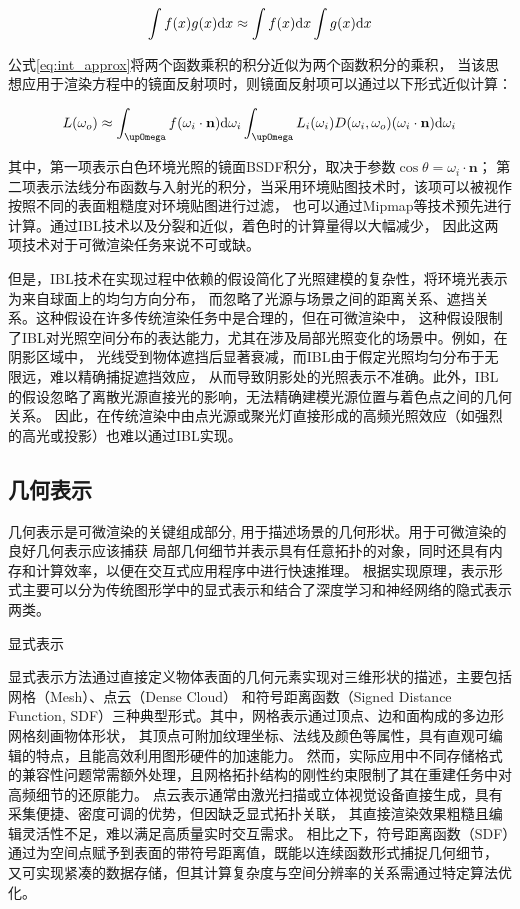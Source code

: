 \begin{equation}
  \int f(x)g(x){\rm{d}}x\approx \int{f(x){\rm{d}}x} \int{g(x){\rm{d}}x}
  \label{eq:int_approx}
\end{equation}

公式\eqref{eq:int_approx}将两个函数乘积的积分近似为两个函数积分的乘积，
当该思想应用于渲染方程中的镜面反射项时，则镜面反射项可以通过以下形式近似计算：

\begin{equation}
  L(\omega_o)\approx 
  \int_{\upOmega}{f(\omega_i\cdot{\bf{n}}){\rm{d}}\omega_i}
  \int_{\upOmega}{L_i(\omega_i)D(\omega_i,\omega_o)(\omega_i\cdot{\bf{n}}){\rm{d}}\omega_i}
  \label{eq:L_omega_o_approx}
\end{equation}

其中，第一项表示白色环境光照的镜面BSDF积分，取决于参数$\cos{\theta}=\omega_i\cdot{\mathbf{n}}；$
第二项表示法线分布函数与入射光的积分，当采用环境贴图技术时，该项可以被视作按照不同的表面粗糙度对环境贴图进行过滤，
也可以通过Mipmap等技术预先进行计算。通过IBL技术以及分裂和近似，着色时的计算量得以大幅减少，
因此这两项技术对于可微渲染任务来说不可或缺。

但是，IBL技术在实现过程中依赖的假设简化了光照建模的复杂性，将环境光表示为来自球面上的均匀方向分布，
而忽略了光源与场景之间的距离关系、遮挡关系。这种假设在许多传统渲染任务中是合理的，但在可微渲染中，
这种假设限制了IBL对光照空间分布的表达能力，尤其在涉及局部光照变化的场景中。例如，在阴影区域中，
光线受到物体遮挡后显著衰减，而IBL由于假定光照均匀分布于无限远，难以精确捕捉遮挡效应，
从而导致阴影处的光照表示不准确。此外，IBL的假设忽略了离散光源直接光的影响，无法精确建模光源位置与着色点之间的几何关系。
因此，在传统渲染中由点光源或聚光灯直接形成的高频光照效应（如强烈的高光或投影）也难以通过IBL实现。

\subsection{几何表示} \label{sec:geo_representation}
几何表示是可微渲染的关键组成部分, 用于描述场景的几何形状。用于可微渲染的良好几何表示应该捕获
局部几何细节并表示具有任意拓扑的对象，同时还具有内存和计算效率，以便在交互式应用程序中进行快速推理。
根据实现原理，表示形式主要可以分为传统图形学中的显式表示和结合了深度学习和神经网络的隐式表示两类。

 显式表示

显式表示方法通过直接定义物体表面的几何元素实现对三维形状的描述，主要包括网格（Mesh）、点云（Dense Cloud）
和符号距离函数（Signed Distance Function, SDF）三种典型形式。其中，网格表示通过顶点、边和面构成的多边形网格刻画物体形状，
其顶点可附加纹理坐标、法线及颜色等属性，具有直观可编辑的特点，且能高效利用图形硬件的加速能力。
然而，实际应用中不同存储格式的兼容性问题常需额外处理，且网格拓扑结构的刚性约束限制了其在重建任务中对高频细节的还原能力。
点云表示通常由激光扫描或立体视觉设备直接生成，具有采集便捷、密度可调的优势，但因缺乏显式拓扑关联，
其直接渲染效果粗糙且编辑灵活性不足，难以满足高质量实时交互需求。
相比之下，符号距离函数（SDF）通过为空间点赋予到表面的带符号距离值，既能以连续函数形式捕捉几何细节，
又可实现紧凑的数据存储，但其计算复杂度与空间分辨率的关系需通过特定算法优化。


